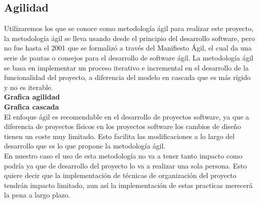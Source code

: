 \documentclass[12pt,a4paper]{article}
\begin{document}
	\subsection{Agilidad}
	Utilizaremos los que se conoce como metodología ágil para realizar este proyecto, la metodología ágil se lleva usando desde el principio del desarrollo software, pero no fue hasta el 2001 que se formalizó a través del Manifiesto Ágil, el cual da una serie de pautas o consejos para el desarrollo de software ágil. La metodología ágil se basa en implementar un proceso iterativo e incremental en el desarrollo de la funcionalidad del proyecto, a diferencia del modelo en cascada que es más rígido y no es iterable.\\
	\textbf{Grafica agilidad}\\
	\textbf{Grafica cascada}\\
	El enfoque ágil es recomendable en el desarrollo de proyectos software, ya que a diferencia de proyectos físicos en los proyectos software los cambios de diseño tienen un coste muy limitado. Esto facilita las modificaciones a lo largo del desarrollo que es lo que propone la metodología ágil.\\
	En nuestro caso el uso de esta metodología no va a tener tanto impacto como podría ya que de desarrollo del proyecto lo va a realizar una sola persona. Esto quiere decir que la implementación de técnicas de organización del proyecto tendrán impacto limitado, aun así la implementación de estas practicas merecerá la pena a largo plazo.\\
	
\end{document}
